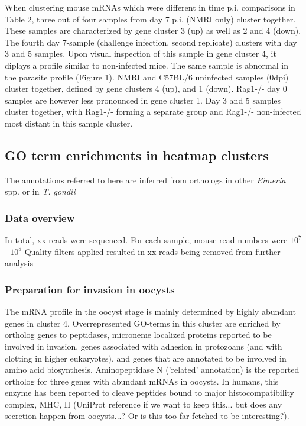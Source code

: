 \documentclass{bmcart}
\begin{document}
When clustering mouse mRNAs which were different in time p.i. comparisons in Table 2, three out of four samples from day 7 p.i. (NMRI only) cluster together. These samples are characterized by gene cluster 3 (up) as well as 2 and 4 (down). The fourth day 7-sample (challenge infection, second replicate) clusters with day 3 and 5 samples. Upon visual inspection of this sample in gene cluster 4, it diplays a profile similar to non-infected mice. The same sample is abnormal in the parasite profile (Figure 1). NMRI and C57BL/6 uninfected samples (0dpi) cluster together, defined by gene clusters 4 (up), and 1 (down). Rag1-/- day 0 samples are however less pronounced in gene cluster 1. Day 3 and 5 samples cluster together, with Rag1-/- forming a separate group and Rag1-/- non-infected most distant in this sample cluster.






\clearpage
\subsection*{GO term enrichments in heatmap clusters}
The annotations referred to here are inferred from orthologs in other \textit{Eimeria} spp. or
in \textit{T. gondii}

\subsubsection*{Data overview}
In total, xx reads were sequenced. For each sample, mouse read numbers were $10^7$ - $10^8$
Quality filters applied resulted in xx reads being removed from further analysis

\subsubsection*{Preparation for invasion in oocysts}
The mRNA profile in the oocyst stage is mainly determined by highly abundant genes in cluster 4.
Overrepresented GO-terms in this cluster are enriched by ortholog genes to 
peptidases, microneme localized proteins reported to be involved in invasion, 
genes associated with adhesion in protozoans (and with clotting in higher eukaryotes),
and genes that are annotated to be involved in amino acid biosynthesis.
  Aminopeptidase N ('related' annotation) is the reported ortholog for three genes with 
abundant mRNAs in oocysts. In humans, this enzyme has been reported to cleave peptides bound to 
major histocompatibility complex, MHC, II (UniProt reference if we want to keep this... but does any
secretion happen from oocysts...? Or is this too far-fetched to be interesting?).
\end{document}
